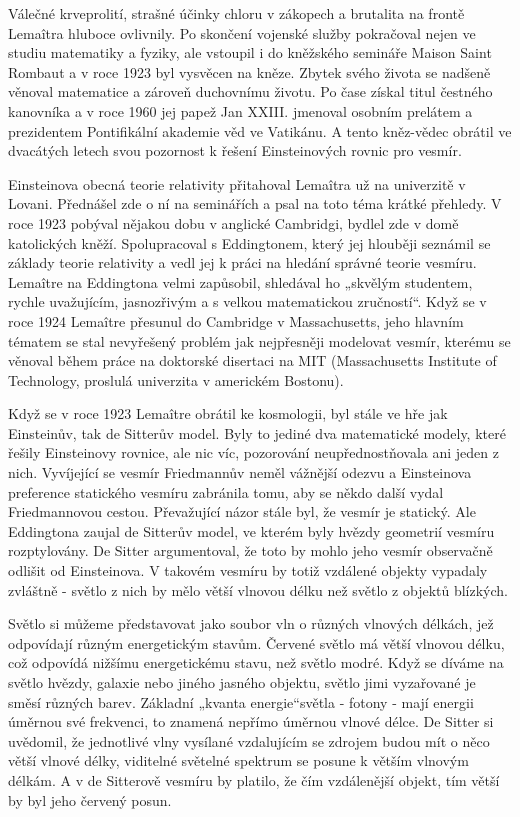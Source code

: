   Válečné krveprolití, strašné účinky chloru v zákopech a brutalita na frontě Lemaîtra hluboce
  ovlivnily. Po skončení vojenské služby pokračoval nejen ve studiu matematiky a fyziky, ale
  vstoupil i do kněžského semináře Maison Saint Rombaut a v roce 1923 byl vysvěcen na kněze. Zbytek
  svého života se nadšeně věnoval matematice a zároveň duchovnímu životu. Po čase získal titul
  čestného kanovníka a v roce 1960 jej papež Jan XXIII. jmenoval osobním prelátem a prezidentem
  Pontifikální akademie věd ve Vatikánu. A tento kněz-vědec obrátil ve dvacátých letech svou
  pozornost k řešení Einsteinových rovnic pro vesmír. 
  
  Einsteinova obecná teorie relativity přitahoval Lemaîtra už na univerzitě v Lovani. Přednášel zde
  o ní na seminářích a psal na toto téma krátké přehledy. V roce 1923 pobýval nějakou dobu v
  anglické Cambridgi, bydlel zde v domě katolických kněží. Spolupracoval s Eddingtonem, který jej
  hlouběji seznámil se základy teorie relativity a vedl jej k práci na hledání správné teorie
  vesmíru. Lemaître na Eddingtona velmi zapůsobil, shledával ho „skvělým studentem, rychle
  uvažujícím, jasnozřivým a s velkou matematickou zručností“. Když se v roce 1924 Lemaître přesunul
  do Cambridge v Massachusetts, jeho hlavním tématem se stal nevyřešený problém jak nejpřesněji
  modelovat vesmír, kterému se věnoval během práce na doktorské disertaci na MIT (Massachusetts
  Institute of Technology, proslulá univerzita v americkém Bostonu). 
  
  Když se v roce 1923 Lemaître obrátil ke kosmologii, byl stále ve hře jak Einsteinův, tak de
  Sitterův model. Byly to jediné dva matematické modely, které řešily Einsteinovy rovnice, ale nic
  víc, pozorování neupřednostňovala ani jeden z nich. Vyvíjející se vesmír Friedmannův neměl
  vážnější odezvu a Einsteinova preference statického vesmíru zabránila tomu, aby se někdo další
  vydal Friedmannovou cestou. Převažující názor stále byl, že vesmír je statický. Ale Eddingtona
  zaujal de Sitterův model, ve kterém byly hvězdy geometrií vesmíru rozptylovány. De Sitter
  argumentoval, že toto by mohlo jeho vesmír observačně odlišit od Einsteinova. V takovém vesmíru by
  totiž vzdálené objekty vypadaly zvláštně - světlo z nich by mělo větší vlnovou délku než světlo z
  objektů blízkých. 
  
  Světlo si můžeme představovat jako soubor vln o různých vlnových délkách, jež odpovídají různým
  energetickým stavům. Červené světlo má větší vlnovou délku, což odpovídá nižšímu energetickému
  stavu, než světlo modré. Když se díváme na světlo hvězdy, galaxie nebo jiného jasného objektu,
  světlo jimi vyzařované je směsí různých barev. Základní „kvanta energie“světla - fotony - mají
  energii úměrnou své frekvenci, to znamená nepřímo úměrnou vlnové délce. De Sitter si uvědomil, že
  jednotlivé vlny vysílané vzdalujícím se zdrojem budou mít o něco větší vlnové délky, viditelné
  světelné spektrum se posune k větším vlnovým délkám. A v de Sitterově vesmíru by platilo, že čím
  vzdálenější objekt, tím větší by byl jeho červený posun. 
  
